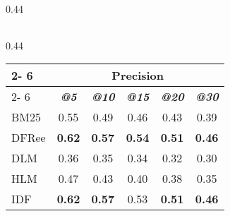 \begin{table*}[]
\begin{small}
\begin{subtable}[b]{0.44\textwidth}
\begin{tabular}{l|c|c|c|c|c}
 	  	\hline
 	  	\end{tabular}
 	  	
 	  	
 	  	 \end{subtable}

 	 \vspace{0.5cm}
 	 \hspace{3.5cm}
  	  	\begin{subtable}[b]{0.44\textwidth}
 	  	 	
 	  	  	\centering
 	  	  	\caption{All collections} 
 	  	 
 	  	 	\begin{tabular}{l|c|c|c|c|c} 
 	  	 	
 	  	 	\cline{2- 6}
 	  	 	\multicolumn{1}{c}{}&\multicolumn{5}{c}{Precision} \\ 
 	  	 	\cline{2- 6} &
 	  	 	\textit{\textbf{@5}} & 
 	  	 	\textit{\textbf{@10}} & 
 	  	 	\textit{\textbf{@15}} & 
 	  	 	\textit{\textbf{@20}} & 
 	  	 	\textit{\textbf{@30}} 
 	  	 	
 	  	 	\tabularnewline
 	  	 	\hline
 	 	 	 BM25 & 0.55 & 0.49 & 0.46 & 0.43 & 0.39 \\
 	 	 	 DFRee  & \textbf{0.62} & \textbf{0.57} & \textbf{0.54} & \textbf{0.51} & \textbf{0.46} \\
 	 	 	 DLM  & 0.36 & 0.35 & 0.34 & 0.32 & 0.30 \\
 	 	 	 HLM  & 0.47 & 0.43 & 0.40 & 0.38 & 0.35 \\
 	 	 	 IDF  & \textbf{0.62} & \textbf{0.57} & 0.53 & \textbf{0.51} & \textbf{0.46} \\
 	  	 
 	  	  	\hline
 	  	  	\end{tabular}
 	  	  	
 	  	 
 	  	  	
 		\end{subtable}
 	 
 	 
  	\label{traditional}
  	  \vspace{0.7cm}
  	  \end{small}
 \end{table*}